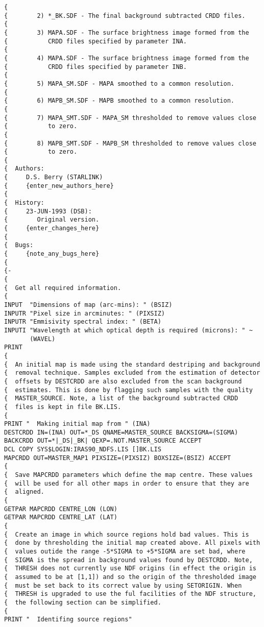 \begin{verbatim}
{
{        2) *_BK.SDF - The final background subtracted CRDD files.
{
{        3) MAPA.SDF - The surface brightness image formed from the
{           CRDD files specified by parameter INA.
{
{        4) MAPA.SDF - The surface brightness image formed from the
{           CRDD files specified by parameter INB.
{
{        5) MAPA_SM.SDF - MAPA smoothed to a common resolution.
{
{        6) MAPB_SM.SDF - MAPB smoothed to a common resolution.
{
{        7) MAPA_SMT.SDF - MAPA_SM thresholded to remove values close
{           to zero.
{
{        8) MAPB_SMT.SDF - MAPB_SM thresholded to remove values close
{           to zero.
{
{  Authors:
{     D.S. Berry (STARLINK)
{     {enter_new_authors_here}
{
{  History:
{     23-JUN-1993 (DSB):
{        Original version.
{     {enter_changes_here}
{
{  Bugs:
{     {note_any_bugs_here}
{
{-
{
{  Get all required information.
{
INPUT  "Dimensions of map (arc-mins): " (BSIZ)
INPUTR "Pixel size in arcminutes: " (PIXSIZ)
INPUTR "Emmisivity spectral index: " (BETA)
INPUTI "Wavelength at which optical depth is required (microns): " ~
       (WAVEL)
PRINT
{
{  An initial map is made using the standard destriping and background
{  removal technique. Samples excluded from the estimation of detector
{  offsets by DESTCRDD are also excluded from the scan background
{  estimates. This is done by flagging such samples with the quality
{  MASTER_SOURCE. Note, a list of the background subtracted CRDD
{  files is kept in file BK.LIS.
{
PRINT "  Making initial map from " (INA)
DESTCRDD IN=(INA) OUT=*_DS QNAME=MASTER_SOURCE BACKSIGMA=(SIGMA)
BACKCRDD OUT=*|_DS|_BK| QEXP=.NOT.MASTER_SOURCE ACCEPT
DCL COPY SYS$LOGIN:IRAS90_NDFS.LIS []BK.LIS
MAPCRDD OUT=MASTER_MAP1 PIXSIZE=(PIXSIZ) BOXSIZE=(BSIZ) ACCEPT
{
{  Save MAPCRDD parameters which define the map centre. These values
{  will be used for all other maps in order to ensure that they are
{  aligned.
{
GETPAR MAPCRDD CENTRE_LON (LON)
GETPAR MAPCRDD CENTRE_LAT (LAT)
{
{  Create an image in which source regions hold bad values. This is
{  done by thresholding the initial map created above. All pixels with
{  values outide the range -5*SIGMA to +5*SIGMA are set bad, where
{  SIGMA is the spread in background values found by DESTCRDD. Note,
{  THRESH does not currently use NDF origins (in effect the origin is
{  assumed to be at [1,1]) and so the origin of the thresholded image
{  must be set back to its correct value by using SETORIGIN. When
{  THRESH is upgraded to use the ful facilities of the NDF structure,
{  the following section can be simplified.
{
PRINT "  Identifing source regions"

\end{verbatim}
